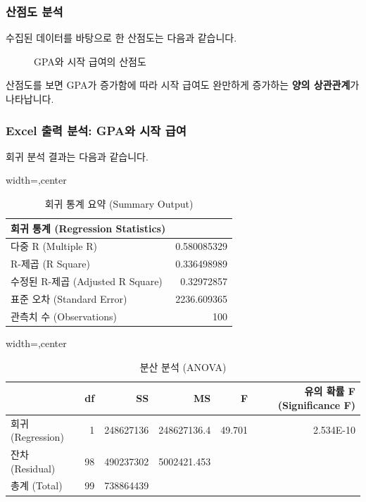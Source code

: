 \documentclass[11pt,a4paper]{article}
\theoremstyle{definition}
\begin{document}
\subsubsection{산점도 분석}
수집된 데이터를 바탕으로 한 산점도는 다음과 같습니다.
\begin{figure}[h!]
    \centering
    \caption{GPA와 시작 급여의 산점도}
    \label{fig:gpa_salary_scatter}
\end{figure}
\begin{tcolorbox}[colback=lightblue,colframe=darkblue,title={산점도 분석: GPA와 시작 급여}]
산점도를 보면 GPA가 증가함에 따라 시작 급여도 완만하게 증가하는 \textbf{양의 상관관계}가 나타납니다.
\end{tcolorbox}

\subsubsection{Excel 출력 분석: GPA와 시작 급여}
회귀 분석 결과는 다음과 같습니다.

\begin{table}[h!]
    \centering
    \caption{회귀 통계 요약 (Summary Output)}
    \label{tab:regression_summary_output_gpa}
    \begin{adjustbox}{width=\textwidth,center}
    \begin{tabular}{lr}
    \toprule
    \textbf{회귀 통계 (Regression Statistics)} & \\
    \midrule
    다중 R (Multiple R) & 0.580085329 \\
    R-제곱 (R Square) & 0.336498989 \\
    수정된 R-제곱 (Adjusted R Square) & 0.32972857 \\
    표준 오차 (Standard Error) & 2236.609365 \\
    관측치 수 (Observations) & 100 \\
    \bottomrule
    \end{tabular}
    \end{adjustbox}
\end{table}

\begin{table}[h!]
    \centering
    \caption{분산 분석 (ANOVA)}
    \label{tab:anova_gpa}
    \begin{adjustbox}{width=\textwidth,center}
    \begin{tabular}{lrrrrr}
    \toprule
    & \textbf{df} & \textbf{SS} & \textbf{MS} & \textbf{F} & \textbf{유의 확률 F (Significance F)} \\
    \midrule
    회귀 (Regression) & 1 & 248627136 & 248627136.4 & 49.701 & 2.534E-10 \\
    잔차 (Residual) & 98 & 490237302 & 5002421.453 & & \\
    총계 (Total) & 99 & 738864439 & & & \\
    \bottomrule
    \end{tabular}
    \end{adjustbox}
\end{table}
\end{document}
